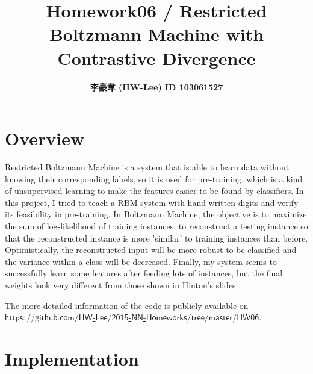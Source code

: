 \documentclass[12pt]{article}
\title{\textbf{Homework06 / Restricted Boltzmann Machine with Contrastive Divergence}}
\author{\textbf{李豪韋 (HW-Lee) ID 103061527}}
\date{}
\begin{document}
\vspace*{-60pt}
    {\let\newpage\relax\maketitle}

\section*{Overview}
\vspace{-20pt}
\noindent\makebox[\linewidth]{\rule{\textwidth}{0.4pt}}
\vspace{5pt}

Restricted Boltzmann Machine is a system that is able to learn data without knowing their corresponding labels, so it is used for pre-training, which is a kind of unsupervised learning to make the features easier to be found by classifiers. In this project, I tried to teach a RBM system with hand-written digits and verify its feasibility in pre-training. In Boltzmann Machine, the objective is to maximize the sum of log-likelihood of training instances, to reconstruct a testing instance so that the reconstructed instance is more 'similar' to training instances than before. Optimistically, the reconstructed input will be more robust to be classified and the variance within a class will be decreased. Finally, my system seems to successfully learn some features after feeding lots of instances, but the final weights look very different from those shown in Hinton's slides.

The more detailed information of the code is publicly available on \href{https://github.com/HW-Lee/2015-NN-Homeworks/tree/master/HW06}{$\mathsf{https://github.com/HW}$-$\mathsf{Lee/2015}$-$\mathsf{NN}$-$\mathsf{Homeworks/tree/master/HW06}$}.

\section*{Implementation}
\vspace{-20pt}
\noindent\makebox[\linewidth]{\rule{\textwidth}{0.4pt}}
\end{document}
